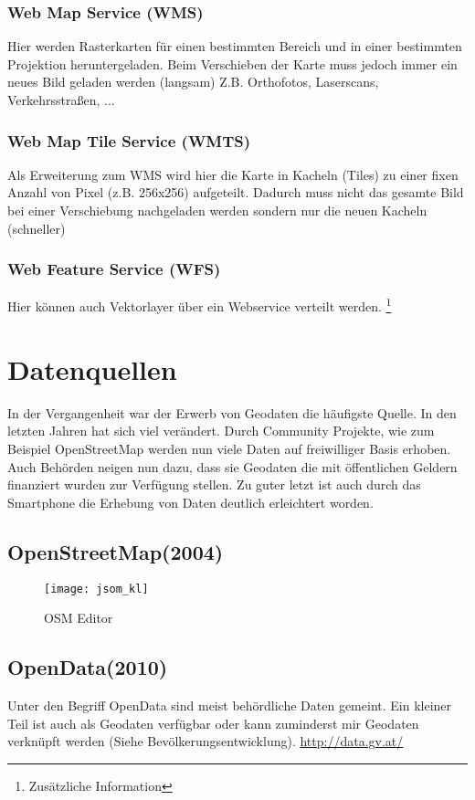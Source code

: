 \documentclass[11pt,fleqn]{book} %
\begin{document}
\subsection{Web Map Service (WMS)}
Hier werden Rasterkarten für einen bestimmten Bereich und in einer bestimmten Projektion heruntergeladen. Beim Verschieben der Karte muss jedoch immer ein neues Bild geladen werden (langsam)  Z.B. Orthofotos, Laserscans, Verkehrsstra{\ss}en, ...


\subsection{Web Map Tile Service (WMTS)}
Als Erweiterung zum WMS wird hier die Karte in Kacheln (Tiles) zu einer fixen Anzahl von Pixel (z.B. 256x256) aufgeteilt. Dadurch muss nicht das gesamte Bild bei einer Verschiebung nachgeladen werden sondern nur die neuen Kacheln (schneller) 


\subsection{Web Feature Service (WFS)}
Hier k\"onnen auch Vektorlayer \"uber ein Webservice verteilt werden.
\footnote{Zus\"atzliche Information}


\chapter{Datenquellen}
In der Vergangenheit war der Erwerb von Geodaten die häufigste Quelle. In den letzten Jahren hat sich viel ver\"andert. Durch Community Projekte, wie zum Beispiel OpenStreetMap werden nun viele Daten auf freiwilliger Basis erhoben. Auch Beh\"orden neigen nun dazu, dass sie Geodaten die mit \"offentlichen Geldern finanziert wurden zur Verf\"ugung stellen. Zu guter letzt ist auch durch das Smartphone die Erhebung von Daten deutlich erleichtert worden.
\section{OpenStreetMap(2004)}

\begin{figure}[h]
\centering\texttt{[image: jsom\_kl]}
\caption{OSM Editor}
\end{figure}

\section{OpenData(2010)}
Unter den Begriff OpenData sind meist beh\"ordliche Daten gemeint. Ein kleiner Teil ist auch als Geodaten verf\"ugbar oder kann zuminderst mir Geodaten verkn\"upft werden (Siehe Bev\"olkerungsentwicklung). \url{http://data.gv.at/} 
\end{document}
